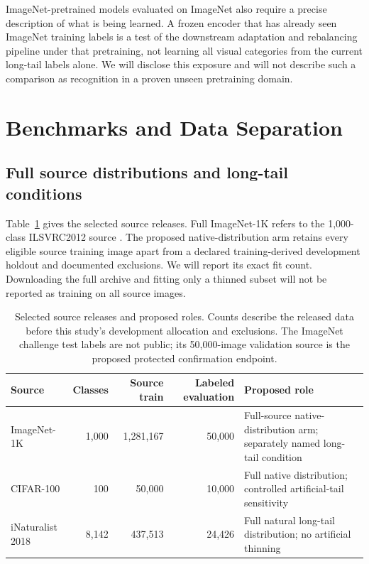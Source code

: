 \documentclass[conference]{IEEEtran}
\begin{document}
ImageNet-pretrained models evaluated on ImageNet also require a precise description of what is being learned. A frozen encoder that has already seen ImageNet training labels is a test of the downstream adaptation and rebalancing pipeline under that pretraining, not learning all visual categories from the current long-tail labels alone. We will disclose this exposure and will not describe such a comparison as recognition in a proven unseen pretraining domain.

\section{Benchmarks and Data Separation}
\subsection{Full source distributions and long-tail conditions}
Table~\ref{tab:data} gives the selected source releases. Full ImageNet-1K refers to the 1,000-class ILSVRC2012 source \cite{russakovsky2015ilsvrc,imagenetdownload}. The proposed native-distribution arm retains every eligible source training image apart from a declared training-derived development holdout and documented exclusions. We will report its exact fit count. Downloading the full archive and fitting only a thinned subset will not be reported as training on all source images.

\begin{table}[t]
\centering\footnotesize
\caption{Selected source releases and proposed roles. Counts describe the released data before this study's development allocation and exclusions. The ImageNet challenge test labels are not public; its 50,000-image validation source is the proposed protected confirmation endpoint.}
\label{tab:data}
\begin{tabularx}{\textwidth}{@{}lrrrX@{}}
\toprule
Source & Classes & Source train & Labeled evaluation & Proposed role\\
\midrule
ImageNet-1K & 1,000 & 1,281,167 & 50,000 & Full-source native-distribution arm; separately named long-tail condition\\
CIFAR-100 & 100 & 50,000 & 10,000 & Full native distribution; controlled artificial-tail sensitivity\\
iNaturalist 2018 & 8,142 & 437,513 & 24,426 & Full natural long-tail distribution; no artificial thinning\\
\bottomrule
\end{tabularx}
\end{table}
\end{document}
